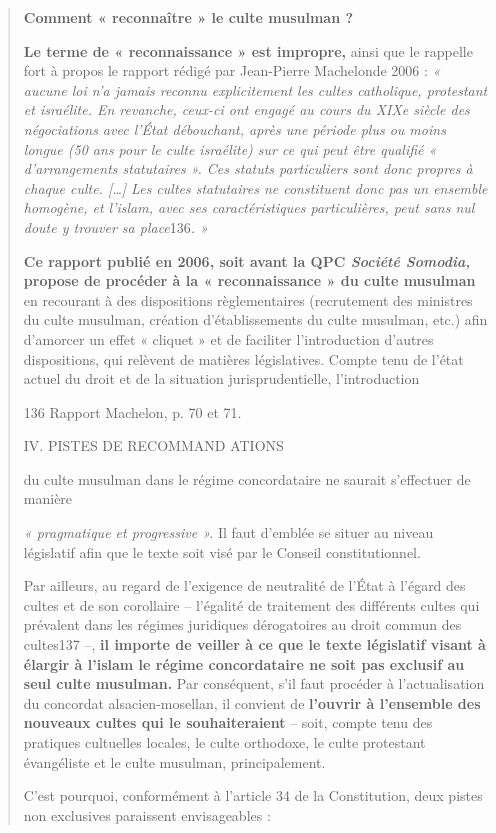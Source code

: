 \begin{quote}
\textbf{Comment « reconnaître » le culte musulman ?}

\textbf{Le terme de « reconnaissance » est impropre,} ainsi que le
rappelle fort à propos le rapport rédigé par Jean-Pierre Machelonde 2006
: \emph{« aucune loi n'a jamais reconnu explicitement les cultes
catholique, protestant et israélite. En revanche, ceux-ci ont engagé au
cours du XIXe siècle des négociations avec l'État débouchant, après une
période plus ou moins longue (50 ans pour le culte israélite) sur ce qui
peut être qualifié « d'arrangements statutaires ». Ces statuts
particuliers sont donc propres à chaque culte. {[}\ldots{]} Les cultes
statutaires ne constituent donc pas un ensemble homogène, et l'islam,
avec ses caractéristiques particulières, peut sans nul doute y trouver
sa place}136\emph{. »}

\textbf{Ce rapport publié en 2006, soit avant la QPC \emph{Société
Somodia,} propose de procéder à la « reconnaissance » du culte musulman}
en recourant à des dispositions règlementaires (recrutement des
ministres du culte musulman, création d'établissements du culte
musulman, etc.) afin d'amorcer un effet « cliquet » et de faciliter
l'introduction d'autres dispositions, qui relèvent de matières
législatives. Compte tenu de l'état actuel du droit et de la situation
jurisprudentielle, l'introduction

136 Rapport Machelon, p. 70 et 71.

IV. PISTES DE RECOMMAND ATIONS

du culte musulman dans le régime concordataire ne saurait s'effectuer de
manière

\emph{« pragmatique et progressive ».} Il faut d'emblée se situer au
niveau législatif afin que le texte soit visé par le Conseil
constitutionnel.

Par ailleurs, au regard de l'exigence de neutralité de l'État à l'égard
des cultes et de son corollaire -- l'égalité de traitement des
différents cultes qui prévalent dans les régimes juridiques dérogatoires
au droit commun des cultes137 --, \textbf{il importe de veiller à ce que
le texte législatif visant à élargir à l'islam le régime concordataire
ne soit pas exclusif au seul culte musulman.} Par conséquent, s'il faut
procéder à l'actualisation du concordat alsacien-mosellan, il convient
de \textbf{l'ouvrir à l'ensemble des nouveaux cultes qui le
souhaiteraient} -- soit, compte tenu des pratiques cultuelles locales,
le culte orthodoxe, le culte protestant évangéliste et le culte
musulman, principalement.

C'est pourquoi, conformément à l'article 34 de la Constitution, deux
pistes non exclusives paraissent envisageables :
\end{quote}

